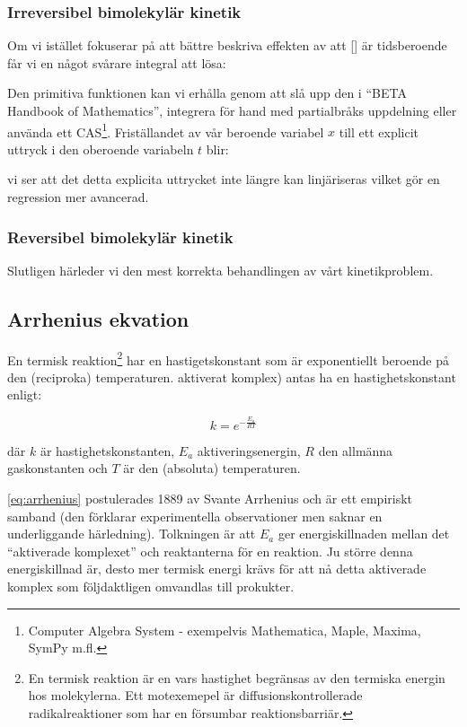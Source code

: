 \subsubsection{Irreversibel bimolekylär kinetik}
\label{sec:irrev_binary}
Om vi istället fokuserar på att bättre beskriva effekten av att
[] är tidsberoende får vi en något svårare integral att lösa:



Den primitiva funktionen kan vi erhålla genom att slå upp den i ``BETA Handbook of
Mathematics'', integrera för hand med partialbråks 
uppdelning eller använda ett CAS\footnote{  Computer Algebra System -
  exempelvis Mathematica, Maple, Maxima, SymPy m.fl.}. Friställandet av
vår beroende variabel $x$ till ett explicit uttryck i den oberoende
variabeln $t$ blir:  



vi ser att det detta explicita uttrycket inte längre kan linjäriseras
vilket gör en regression mer avancerad.

\subsubsection{Reversibel bimolekylär kinetik}
Slutligen härleder vi den mest korrekta behandlingen av vårt kinetikproblem.
\label{sec:rev_binary}




\subsection{Arrhenius ekvation}
En termisk reaktion\footnote{En termisk reaktion är en vars hastighet begränsas av den termiska
energin hos molekylerna. Ett motexemepel är diffusionskontrollerade
radikalreaktioner som har en försumbar reaktionsbarriär.} har en
hastigetskonstant som är exponentiellt beroende på den (reciproka) temperaturen.
aktiverat komplex) antas ha en hastighetskonstant enligt:

\begin{equation}
  \label{eq:arrhenius}
  k = e^{-\frac{E_a}{RT}}
\end{equation}

där $k$ är hastighetskonstanten, $E_a$ aktiveringsenergin, $R$ den
allmänna gaskonstanten och $T$ är den (absoluta) temperaturen.

\cref{eq:arrhenius} postulerades 1889 av Svante Arrhenius och är ett
empiriskt samband (den förklarar experimentella observationer men saknar
en underliggande härledning). Tolkningen är att $E_a$ ger
energiskillnaden mellan det ``aktiverade komplexet'' och reaktanterna för
en reaktion. Ju större denna energiskillnad är, desto mer termisk energi
krävs för att nå detta aktiverade komplex som följdaktligen omvandlas
till prokukter.

